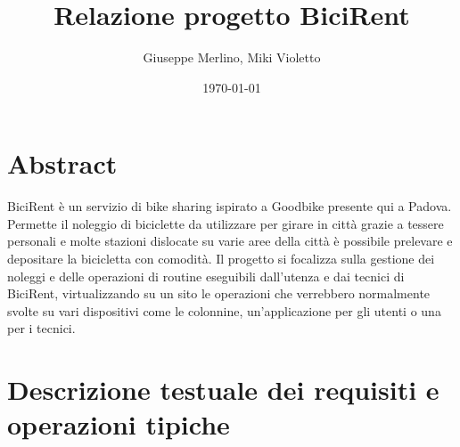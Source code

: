 \documentclass[a4paper,twoside]{article}
\author{Giuseppe Merlino, Miki Violetto}
\title{Relazione progetto BiciRent}
\date{\today}
\begin{document}
\maketitle

\newpage
\tableofcontents
\newpage
\listoffigures
\newpage

\section{Abstract}
BiciRent è un servizio di bike sharing ispirato a Goodbike presente qui a Padova.\newline
Permette il noleggio di biciclette da utilizzare per girare in città grazie a tessere personali e molte stazioni dislocate su varie aree della città è possibile prelevare e depositare la bicicletta con comodità.\newline
Il progetto si focalizza sulla gestione dei noleggi e delle operazioni di routine eseguibili dall'utenza e dai tecnici di BiciRent, virtualizzando su un sito le operazioni che verrebbero normalmente svolte su vari dispositivi come le colonnine, un'applicazione per gli utenti o una per i tecnici.
\section{Descrizione testuale dei requisiti e operazioni tipiche}
\end{document}
